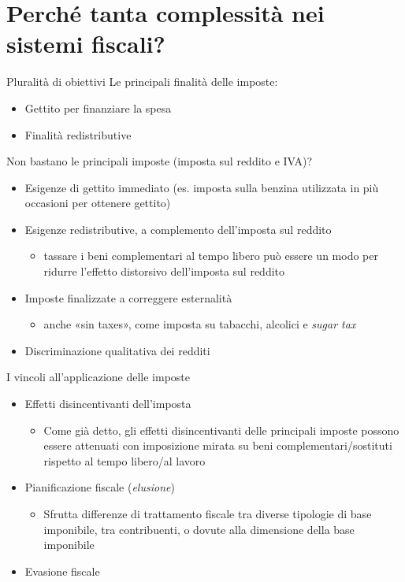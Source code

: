 \documentclass[aspectratio=64,11pt]{beamer}
\begin{document}
\section{Perché tanta complessità nei sistemi fiscali?}

\begin{frame}{Pluralità di obiettivi}
Le principali finalità delle imposte:
\begin{itemize}
\item Gettito per finanziare la spesa
\item Finalità redistributive
\end{itemize}
Non bastano le principali imposte (imposta sul reddito e IVA)?
\begin{itemize}
\item Esigenze di gettito immediato (es. imposta sulla benzina utilizzata in più
occasioni per ottenere gettito)
\item Esigenze redistributive, a complemento dell'imposta sul reddito
\begin{itemize}
\item tassare i beni complementari al tempo libero può essere un modo per
ridurre l'effetto distorsivo dell'imposta sul reddito
\end{itemize}
\item Imposte finalizzate a correggere esternalità
\begin{itemize}
\item anche «sin taxes», come imposta su tabacchi, alcolici e \emph{sugar tax}
\end{itemize}
\item Discriminazione qualitativa dei redditi
\end{itemize}
\end{frame}
\begin{frame}{I vincoli all'applicazione delle imposte}
\begin{itemize}
\item Effetti disincentivanti dell'imposta
\begin{itemize}
\item Come già detto, gli effetti disincentivanti delle principali imposte
possono essere attenuati con imposizione mirata su beni
complementari/sostituti rispetto al tempo libero/al lavoro
\end{itemize}
\item Pianificazione fiscale (\emph{elusione})
\begin{itemize}
\item Sfrutta differenze di trattamento fiscale tra diverse tipologie di base
imponibile, tra contribuenti, o dovute alla dimensione della base
imponibile
\end{itemize}
\item Evasione fiscale
\end{itemize}
\end{frame}
\end{document}
